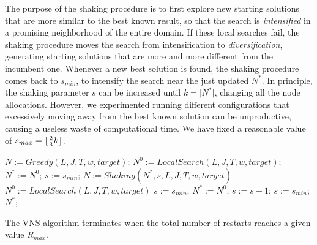 The purpose of the shaking procedure is to first explore new starting solutions that are more similar to the best known result, so that the search is \emph{intensified} in a promising neighborhood of the entire domain. If these local searches fail, the shaking procedure moves the search from intensification to \emph{diversification}, generating starting solutions that are more and more different from the incumbent one. Whenever a new best solution is found, the shaking procedure comes back to \(s_{min}\), to intensify the search near the just updated \(N^*\). In principle, the shaking parameter \(s\) can be increased until $k=\lvert N^* \rvert$, changing all the node allocations. However, we experimented running different configurations that excessively moving away from the best known solution can be unproductive, causing a useless waste of computational time. We have fixed a reasonable value of \(s_{max} = \lfloor\frac{2}{3}k\rfloor\).

\begin{algorithm}
\caption{\(VNS (L, J, T, w, target, s_{min}, s_{max}, R_{max})\)}
\begin{algorithmic}%
\label{alg:vns}
\State $N:=Greedy(L, J, T, w, target)$;
\State $N^{0}:=LocalSearch(L, J, T, w, target)$;
\State $N^* := N^0$;
\State $s := s_{min}$;
\State $N:= Shaking(N^*, s, L, J, T, w, target)$
\State $N^0:= LocalSearch(L, J, T, w, target)$
\State $s:=s_{min}$;
\State $N^*:=N^0$;
\Else
\State $s:=s+1$;
\State $s:=s_{min}$;
\EndIf
\EndIf
\EndFor
\State \Return $N^*$;
\end{algorithmic}
\end{algorithm}

The VNS algorithm terminates when the total number of restarts reaches a given value $R_{max}$.

